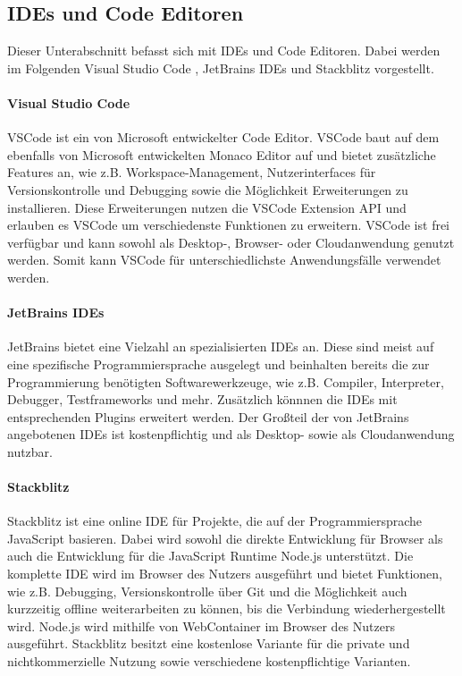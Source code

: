\subsection{IDEs und Code Editoren}\label{section:stand-der-technik:weitere-entwicklungen:ides-und-code-editoren}

Dieser Unterabschnitt befasst sich mit IDEs und Code Editoren. Dabei werden im Folgenden Visual Studio Code \cite{noauthor_vscode_nodate}, JetBrains IDEs \cite{noauthor_jetbrains_nodate} und Stackblitz \cite{noauthor_stackblitz_nodate} vorgestellt.

\paragraph{Visual Studio Code}
\acf{VSCode} \cite{noauthor_vscode_nodate} ist ein von Microsoft \cite{noauthor_microsoft_nodate} entwickelter Code Editor. \ac{VSCode} baut auf dem ebenfalls von Microsoft entwickelten Monaco Editor \cite{noauthor_monaco_nodate} auf und bietet zusätzliche Features an, wie z.B. Workspace-Management, Nutzerinterfaces für Versionskontrolle und Debugging sowie die Möglichkeit Erweiterungen zu installieren. Diese Erweiterungen nutzen die VSCode Extension API \cite{noauthor_vscode-extension-api_nodate} und erlauben es \ac{VSCode} um verschiedenste Funktionen zu erweitern. \ac{VSCode} ist frei verfügbar und kann sowohl als Desktop-, Browser- oder Cloudanwendung genutzt werden. Somit kann \ac{VSCode} für unterschiedlichste Anwendungsfälle verwendet werden.

\paragraph{JetBrains IDEs}
JetBrains \cite{noauthor_jetbrains_nodate} bietet eine Vielzahl an spezialisierten IDEs an. Diese sind meist auf eine spezifische Programmiersprache ausgelegt und beinhalten bereits die zur Programmierung benötigten Softwarewerkzeuge, wie z.B. Compiler, Interpreter, Debugger, Testframeworks und mehr. Zusätzlich könnnen die IDEs mit entsprechenden Plugins \cite{noauthor_jetbrains-plugins_nodate} erweitert werden. Der Großteil der von JetBrains angebotenen IDEs ist kostenpflichtig und als Desktop- sowie als Cloudanwendung nutzbar.

\paragraph{Stackblitz}
Stackblitz \cite{noauthor_stackblitz_nodate} ist eine online IDE für Projekte, die auf der Programmiersprache JavaScript basieren. Dabei wird sowohl die direkte Entwicklung für Browser als auch die Entwicklung für die JavaScript Runtime Node.js \cite{noauthor_nodejs_nodate} unterstützt. Die komplette IDE wird im Browser des Nutzers ausgeführt und bietet Funktionen, wie z.B. Debugging, Versionskontrolle über Git und die Möglichkeit auch kurzzeitig offline weiterarbeiten zu können, bis die Verbindung wiederhergestellt wird. Node.js wird mithilfe von WebContainer \cite{noauthor_webcontainer_nodate} im Browser des Nutzers ausgeführt. Stackblitz besitzt eine kostenlose Variante für die private und nichtkommerzielle Nutzung sowie verschiedene kostenpflichtige Varianten.